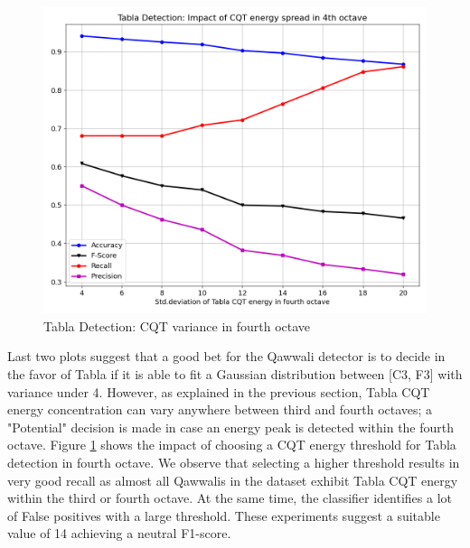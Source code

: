 \documentclass{article}
\begin{document}
\begin{figure}[htbp]
  \centering
  \includegraphics[scale=0.75, width=0.95\columnwidth]{o4}
  \caption{Tabla Detection: CQT variance in fourth octave}
\label{fig:src_o4}
\end{figure}
Last two plots suggest that a good bet for the Qawwali detector is to decide in the favor of Tabla if it is able to fit a Gaussian distribution between [C3, F3] with variance under 4. However, as explained in the previous section, Tabla CQT energy concentration can vary anywhere between third and fourth octaves; a "Potential" decision is made in case an energy peak is detected within the fourth octave. Figure \ref{fig:src_o4} shows the impact of choosing a CQT energy threshold for Tabla detection in fourth octave. We observe that selecting a higher threshold results in very good recall as almost all Qawwalis in the dataset exhibit Tabla CQT energy within the third or fourth octave. At the same time, the classifier identifies a lot of False positives with a large threshold. These experiments suggest a suitable value of 14 achieving a neutral F1-score.
\end{document}
